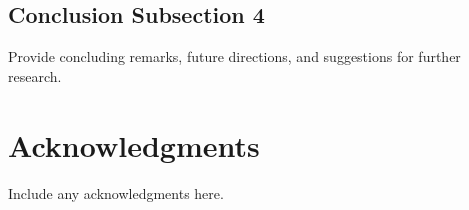 \documentclass[12pt]{article}
\begin{document}
\subsection{Conclusion Subsection 4}
\label{subsec:conclusion4}

Provide concluding remarks, future directions, and suggestions for further research.

\section*{Acknowledgments}

Include any acknowledgments here.



\end{document}
